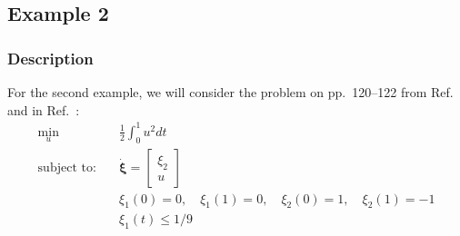 \subsection{Example 2} \label{sec:ch5:example2}

\subsubsection{Description}
For the second example, we will consider the problem on pp.~120--122 from Ref.~\cite{Bryson1975a} and in Ref.~\cite{Bryson1963a}:
\begin{subequations}%
\begin{align}
\min_{u} \quad & \frac{1}{2}\int_{0}^{1} u^2 dt \\
\text{subject to:} \quad  & \dot{\bm{\xi}} = \begin{bmatrix} \xi_2 \\ u \end{bmatrix} \\
& \xi_1(0) = 0, \quad \xi_1(1) = 0, \quad \xi_2(0) = 1, \quad \xi_2(1) = -1 \\
& \xi_1(t) \leq 1/9
\end{align}
\end{subequations}%

